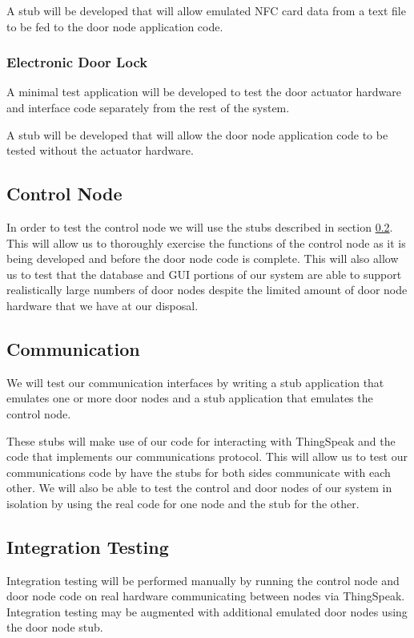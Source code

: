 A stub will be developed that will allow emulated NFC card data from a text file
to be fed to the door node application code.

\subsubsection{Electronic Door Lock}

A minimal test application will be developed to test the door actuator hardware
and interface code separately from the rest of the system.

A stub will be developed that will allow the door node application code to be
tested without the actuator hardware.

\subsection{Control Node}

In order to test the control node we will use the stubs described in section
\ref{subsec:testing-communication}. This will allow us to thoroughly
exercise the functions of the control node as it is being developed and before
the door node code is complete. This will also allow us to test that the
database and GUI portions of our system are able to support realistically large
numbers of door nodes despite the limited amount of door node hardware that we
have at our disposal.

\subsection{Communication}
\label{subsec:testing-communication}

We will test our communication interfaces by writing a stub application that
emulates one or more door nodes and a stub application that emulates the control
node.

These stubs will make use of our code for interacting with ThingSpeak and the
code that implements our communications protocol. This will allow us to test our
communications code by have the stubs for both sides communicate with each
other. We will also be able to test the control and door nodes of our system in
isolation by using the real code for one node and the stub for the other.

\subsection{Integration Testing}

Integration testing will be performed manually by running the control node and
door node code on real hardware communicating between nodes via ThingSpeak.
Integration testing may be augmented with additional emulated door nodes using
the door node stub.

